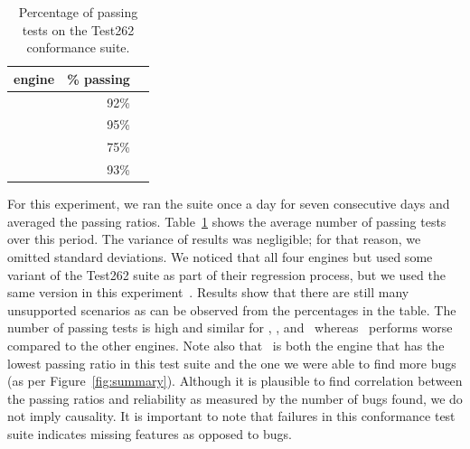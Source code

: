 \documentclass[sigconf,review, anonymous]{acmart}
\begin{document}
\begin{table}
  \centering
  \caption{\label{tab:test262}Percentage of passing tests on
    the Test262 conformance suite.}
  \vspace{-2ex}        
  \small
  \begin{tabular}{crr}
    \toprule
    engine & \% passing \\
    \midrule
    \jsc{} & 92\%\\
    \veight{} & 95\% \\
    \chakra{} & 75\% \\    
    \smonkey{} & 93\% \\
    \bottomrule
  \end{tabular}
  \normalsize
  \vspace{-4ex}
\end{table}
For this experiment, we ran the suite once a day for seven consecutive
days and averaged the passing ratios. Table~\ref{tab:test262} shows
the average number of passing tests over this period. The variance of
results was negligible; for that reason, we omitted standard
deviations. We noticed that all four engines but \chakra{} used some
variant of the Test262 suite as part of their regression process, but
we used the same version in this
experiment~\cite{ecma262-conformance-suite}. Results show that there
are still many unsupported scenarios as can be observed from the
percentages in the table. The number of passing tests is high and
similar for \jsc{}, \veight{}, and \smonkey\ whereas \chakra\ performs
worse compared to the other engines. Note also that \chakra\ is both
the engine that has the lowest passing ratio in this test suite and
the one we were able to find more bugs (as per
Figure~\ref{fig:summary}). Although it is plausible to find
correlation between the passing ratios and reliability as measured by
the number of bugs found, we do not imply causality. It is important
to note that failures in this conformance test suite indicates missing
features as opposed to bugs.

\begin{center}
\end{center}
\end{document}

